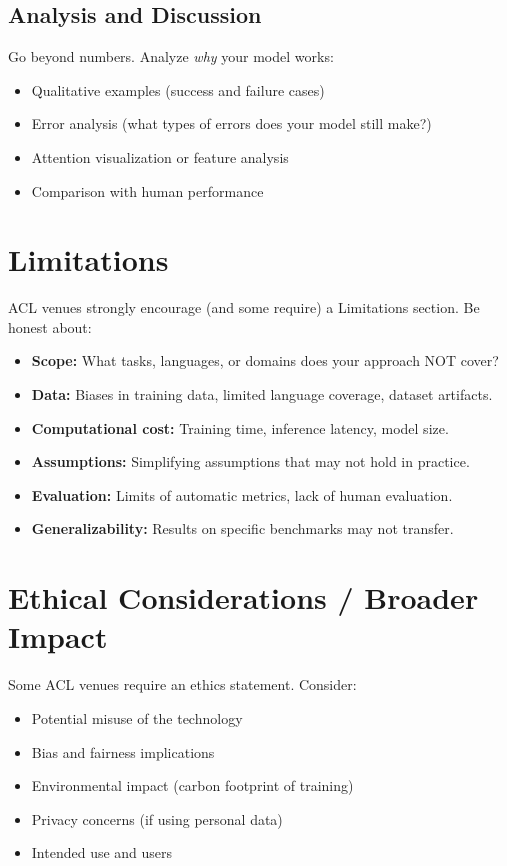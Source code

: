 \documentclass[11pt,a4paper]{article}
\begin{document}
\subsection{Analysis and Discussion}

Go beyond numbers. Analyze \emph{why} your model works:
\begin{itemize}
  \item Qualitative examples (success and failure cases)
  \item Error analysis (what types of errors does your model still make?)
  \item Attention visualization or feature analysis
  \item Comparison with human performance
\end{itemize}

\section*{Limitations}

ACL venues strongly encourage (and some require) a Limitations section. 
Be honest about:
\begin{itemize}
  \item \textbf{Scope:} What tasks, languages, or domains does your approach 
    NOT cover?
  \item \textbf{Data:} Biases in training data, limited language coverage, 
    dataset artifacts.
  \item \textbf{Computational cost:} Training time, inference latency, model 
    size.
  \item \textbf{Assumptions:} Simplifying assumptions that may not hold in 
    practice.
  \item \textbf{Evaluation:} Limits of automatic metrics, lack of human 
    evaluation.
  \item \textbf{Generalizability:} Results on specific benchmarks may not 
    transfer.
\end{itemize}

\section*{Ethical Considerations / Broader Impact}

Some ACL venues require an ethics statement. Consider:
\begin{itemize}
  \item Potential misuse of the technology
  \item Bias and fairness implications
  \item Environmental impact (carbon footprint of training)
  \item Privacy concerns (if using personal data)
  \item Intended use and users
\end{itemize}
\end{document}
